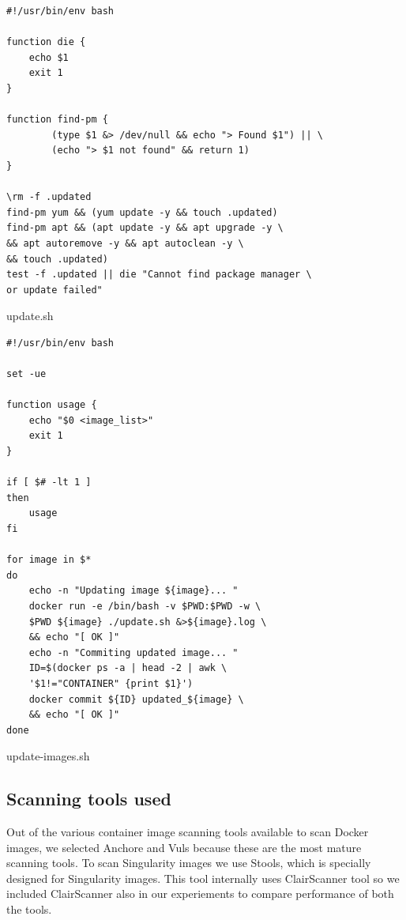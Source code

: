 \documentclass[a4paper,num-refs]{oup-contemporary}
\begin{document}
\begin{listing}
\begin{verbatim}
#!/usr/bin/env bash

function die {
	echo $1
	exit 1
}

function find-pm {
		(type $1 &> /dev/null && echo "> Found $1") || \
		(echo "> $1 not found" && return 1)
}

\rm -f .updated
find-pm yum && (yum update -y && touch .updated) 
find-pm apt && (apt update -y && apt upgrade -y \
&& apt autoremove -y && apt autoclean -y \
&& touch .updated)
test -f .updated || die "Cannot find package manager \
or update failed"	       
\end{verbatim}
\caption{update.sh}
\label{listing:update.sh}
\end{listing}


\begin{listing}
\begin{verbatim}
#!/usr/bin/env bash

set -ue

function usage {
	echo "$0 <image_list>"
	exit 1
}

if [ $# -lt 1 ]
then
	usage
fi

for image in $*
do
	echo -n "Updating image ${image}... "
	docker run -e /bin/bash -v $PWD:$PWD -w \
	$PWD ${image} ./update.sh &>${image}.log \
	&& echo "[ OK ]"
	echo -n "Commiting updated image... "
	ID=$(docker ps -a | head -2 | awk \
	'$1!="CONTAINER" {print $1}')
	docker commit ${ID} updated_${image} \
	&& echo "[ OK ]"
done
\end{verbatim}
\caption{update-images.sh}
\label{listing:update-images.sh}
\end{listing}


\subsection{Scanning tools used}

Out of the various container image scanning tools available to scan Docker images,
we selected Anchore
and Vuls because these are the most mature scanning tools. To scan Singularity images
we use Stools, which is specially designed for Singularity images. This tool internally uses
ClairScanner tool so we included ClairScanner also in our experiements to compare
performance of both the tools.
\end{document}

